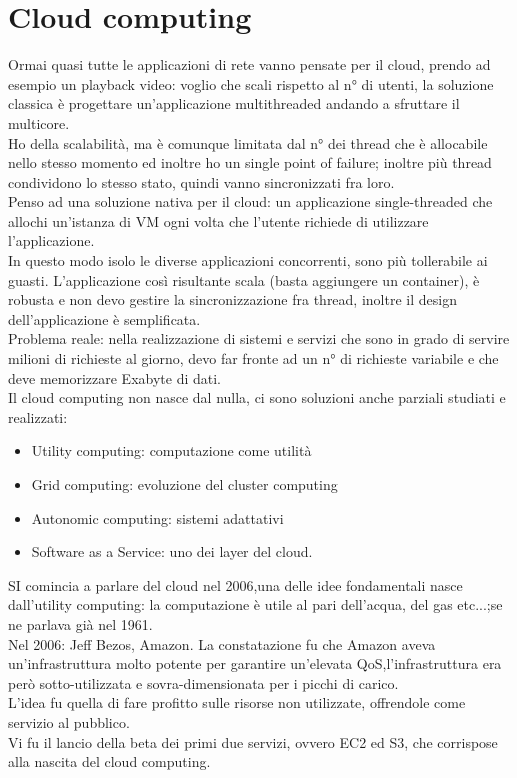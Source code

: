 \documentclass{article}
\begin{document}
\section{Cloud computing}
Ormai quasi tutte le applicazioni di rete vanno pensate per il cloud, prendo ad esempio un playback video: voglio che scali rispetto al n° di utenti, la soluzione classica è progettare un'applicazione multithreaded andando a sfruttare il multicore. \\ Ho della scalabilità, ma è comunque limitata dal n° dei thread che è allocabile nello stesso momento ed inoltre ho un single point of failure; inoltre più thread condividono lo stesso stato, quindi vanno sincronizzati fra loro.\\ Penso ad una soluzione nativa per il cloud: un applicazione single-threaded che allochi un'istanza di VM ogni volta che l'utente richiede di utilizzare l'applicazione.\\ In questo modo isolo le diverse applicazioni concorrenti, sono più tollerabile ai guasti. L'applicazione così risultante scala (basta aggiungere un container), è robusta e non devo gestire la sincronizzazione fra thread, inoltre il design dell'applicazione è semplificata.\\ Problema reale: nella realizzazione di sistemi e servizi che sono in grado di servire milioni di richieste al giorno, devo far fronte ad un n° di richieste variabile e che deve memorizzare Exabyte di dati.\\ Il cloud computing non nasce dal nulla, ci sono soluzioni anche parziali studiati e realizzati:
\begin{itemize}
\item Utility computing: computazione come utilità
\item Grid computing: evoluzione del cluster computing
\item Autonomic computing: sistemi adattativi
\item Software as a Service: uno dei layer del cloud.
\end{itemize}
SI comincia a parlare del cloud nel 2006,una delle idee fondamentali nasce dall'utility computing: la computazione è utile al pari dell'acqua, del gas etc...;se ne parlava già nel 1961.\\ Nel 2006: Jeff Bezos, Amazon. La constatazione fu che Amazon aveva un'infrastruttura molto potente per garantire un'elevata QoS,l'infrastruttura era però sotto-utilizzata e sovra-dimensionata per i picchi di carico.\\ L'idea fu quella di fare profitto sulle risorse non utilizzate, offrendole come servizio al pubblico.\\ Vi fu il lancio della beta dei primi due servizi, ovvero EC2 ed S3, che corrispose alla nascita del cloud computing.
\end{document}
